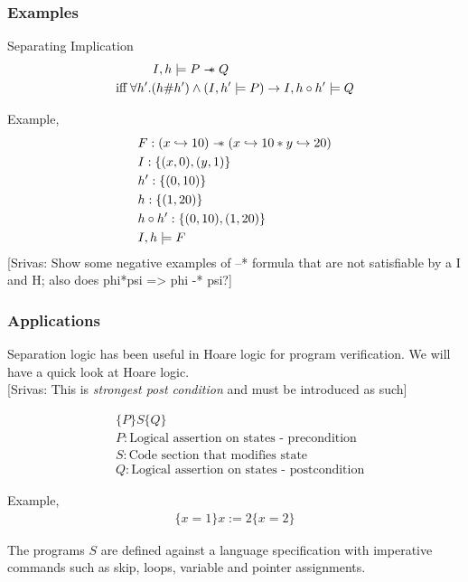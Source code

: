 \documentclass{beamer}
\newcommand\sepimp{\mathrel{-\mkern-6mu*}}
\newcommand{\mscmt}[1]{{\color{blue} [Srivas: {#1}]}}
\begin{document}
\begin{frame}
\frametitle{Examples}
Separating Implication
\begin{align*}
    I,h \models P \sepimp Q \hspace{3.5cm} \\ 
    \textrm{iff} \; \forall h'.(h \# h') \land (I,h' \models P) \to I,h \circ h' \models Q
\end{align*}

Example,
\begin{align*}
    & F : (x \hookrightarrow 10) \sepimp (x \hookrightarrow 10 * y \hookrightarrow 20) \\
    & I : \{(x,0), (y,1)\} \\
    & h' : \{(0,10)\} \\
    & h : \{(1,20) \} \\
    & h \circ h' : \{(0,10), (1,20)\} \\
    & I,h \models F
\end{align*}
\mscmt{\tiny{Show some negative examples of --* formula that are not satisfiable by a I and H; also does phi*psi => phi -* psi?}}
\end{frame}

\begin{frame}
\frametitle{Applications}
Separation logic has been useful in Hoare logic for program verification. We will
have a quick look at Hoare logic. \\
\mscmt{\tiny{This is \emph{strongest post condition} and must be introduced as such}}

\begin{align*}
    & \{P\}S\{Q\} \\
    & P : \textrm{Logical assertion on states - precondition} \\
    & S : \textrm{Code section that modifies state} \\
    & Q : \textrm{Logical assertion on states - postcondition}
\end{align*}

Example,
\begin{align*}
    \{x = 1\}x := 2\{x = 2\}
\end{align*}

The programs $S$ are defined against a language specification with 
imperative commands such as skip, loops,
variable and pointer assignments.
\end{frame}
\end{document}
